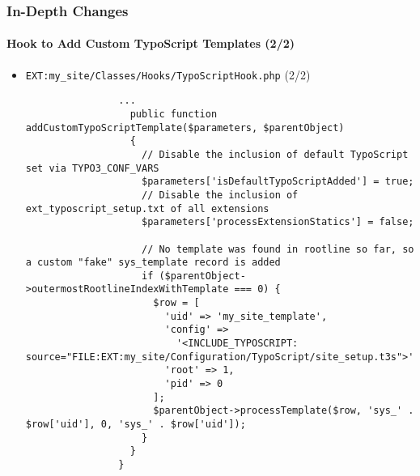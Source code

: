 \begin{frame}[fragile]
	\frametitle{In-Depth Changes}
	\framesubtitle{Hook to Add Custom TypoScript Templates (2/2)}

	\lstset{basicstyle=\tiny\ttfamily}

	\begin{itemize}
		\item \texttt{EXT:my\_site/Classes/Hooks/TypoScriptHook.php} (2/2)

			\begin{lstlisting}
				...
				  public function addCustomTypoScriptTemplate($parameters, $parentObject)
				  {
				    // Disable the inclusion of default TypoScript set via TYPO3_CONF_VARS
				    $parameters['isDefaultTypoScriptAdded'] = true;
				    // Disable the inclusion of ext_typoscript_setup.txt of all extensions
				    $parameters['processExtensionStatics'] = false;

				    // No template was found in rootline so far, so a custom "fake" sys_template record is added
				    if ($parentObject->outermostRootlineIndexWithTemplate === 0) {
				      $row = [
				        'uid' => 'my_site_template',
				        'config' =>
					      '<INCLUDE_TYPOSCRIPT: source="FILE:EXT:my_site/Configuration/TypoScript/site_setup.t3s">',
				        'root' => 1,
				        'pid' => 0
				      ];
				      $parentObject->processTemplate($row, 'sys_' . $row['uid'], 0, 'sys_' . $row['uid']);
				    }
				  }
				}
			\end{lstlisting}

	\end{itemize}

\end{frame}

